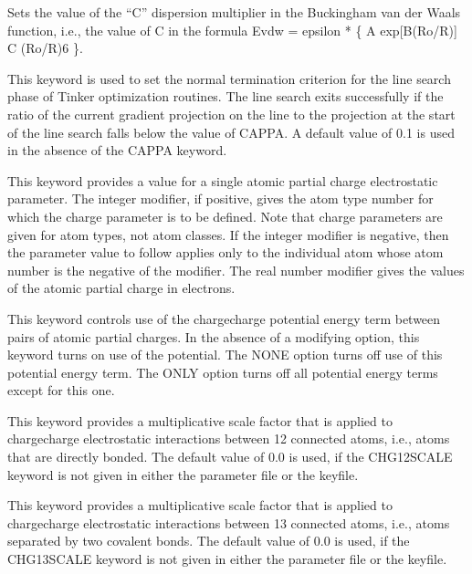\documentclass[letterpaper,11pt,english]{sphinxmanual}
\begin{document}
  Sets the value of the “C” dispersion multiplier in the Buckingham van der Waals function, i.e., the value of C in the formula Evdw = epsilon * \{ A exp{[}\sphinxhyphen{}B(Ro/R){]} \sphinxhyphen{} C (Ro/R)6 \}.

  This keyword is used to set the normal termination criterion for the line search phase of Tinker optimization routines. The line search exits successfully if the ratio of the current gradient projection on the line to the projection at the start of the line search falls below the value of CAPPA. A default value of 0.1 is used in the absence of the CAPPA keyword.

  This keyword provides a value for a single atomic partial charge electrostatic parameter. The integer modifier, if positive, gives the atom type number for which the charge parameter is to be defined. Note that charge parameters are given for atom types, not atom classes. If the integer modifier is negative, then the parameter value to follow applies only to the individual atom whose atom number is the negative of the modifier. The real number modifier gives the values of the atomic partial charge in electrons.

  This keyword controls use of the charge\sphinxhyphen{}charge potential energy term between pairs of atomic partial charges. In the absence of a modifying option, this keyword turns on use of the potential. The NONE option turns off use of this potential energy term. The ONLY option turns off all potential energy terms except for this one.

  This keyword provides a multiplicative scale factor that is applied to charge\sphinxhyphen{}charge electrostatic interactions between 1\sphinxhyphen{}2 connected atoms, i.e., atoms that are directly bonded. The default value of 0.0 is used, if the CHG\sphinxhyphen{}12\sphinxhyphen{}SCALE keyword is not given in either the parameter file or the keyfile.

  This keyword provides a multiplicative scale factor that is applied to charge\sphinxhyphen{}charge electrostatic interactions between 1\sphinxhyphen{}3 connected atoms, i.e., atoms separated by two covalent bonds. The default value of 0.0 is used, if the CHG\sphinxhyphen{}13\sphinxhyphen{}SCALE keyword is not given in either the parameter file or the keyfile.
\end{document}
